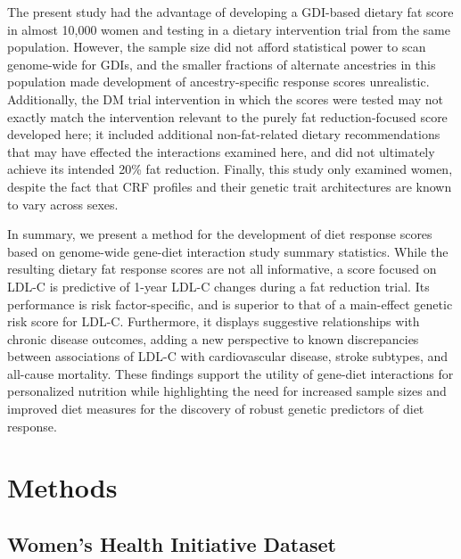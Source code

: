 \documentclass[]{article}
\begin{document}
The present study had the advantage of developing a GDI-based dietary
fat score in almost 10,000 women and testing in a dietary intervention
trial from the same population. However, the sample size did not afford
statistical power to scan genome-wide for GDIs, and the smaller
fractions of alternate ancestries in this population made development of
ancestry-specific response scores unrealistic. Additionally, the DM
trial intervention in which the scores were tested may not exactly match
the intervention relevant to the purely fat reduction-focused score
developed here; it included additional non-fat-related dietary
recommendations that may have effected the interactions examined here,
and did not ultimately achieve its intended 20\% fat reduction. Finally,
this study only examined women, despite the fact that CRF profiles and
their genetic trait architectures are known to vary across sexes.

In summary, we present a method for the development of diet response
scores based on genome-wide gene-diet interaction study summary
statistics. While the resulting dietary fat response scores are not all
informative, a score focused on LDL-C is predictive of 1-year LDL-C
changes during a fat reduction trial. Its performance is risk
factor-specific, and is superior to that of a main-effect genetic risk
score for LDL-C. Furthermore, it displays suggestive relationships with
chronic disease outcomes, adding a new perspective to known
discrepancies between associations of LDL-C with cardiovascular disease,
stroke subtypes, and all-cause mortality. These findings support the
utility of gene-diet interactions for personalized nutrition while
highlighting the need for increased sample sizes and improved diet
measures for the discovery of robust genetic predictors of diet
response.

\hypertarget{methods}{%
\section{Methods}\label{methods}}

\hypertarget{womens-health-initiative-dataset}{%
\subsection{Women's Health Initiative
Dataset}\label{womens-health-initiative-dataset}}
\end{document}
